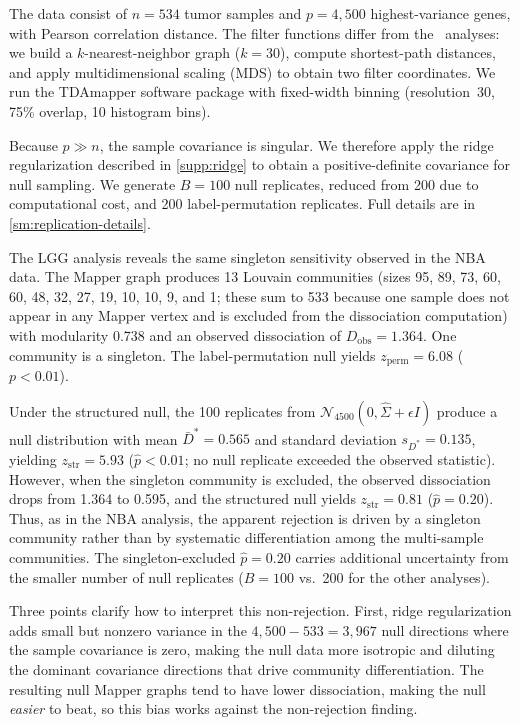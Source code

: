 \documentclass[hidelinks]{siamart251216}
\newcommand{\singletonExcludedLGGz}{0.81}
\begin{document}
The data consist of $n = 534$ tumor samples and $p = 4{,}500$
highest-variance genes, with Pearson correlation distance.  The filter
functions differ from the~\cite{Lum2013} analyses: we build a
$k$-nearest-neighbor graph ($k = 30$), compute shortest-path distances,
and apply multidimensional scaling (MDS) to obtain two filter
coordinates.  We run the TDAmapper software package with fixed-width
binning (resolution~30, 75\% overlap, 10 histogram bins).

Because $p \gg n$, the sample covariance is singular.  We therefore
apply the ridge regularization described in \cref{supp:ridge} to obtain
a positive-definite covariance for null sampling.  We generate $B = 100$
null replicates, reduced from 200 due to computational cost, and 200
label-permutation replicates.  Full details are in
\cref{sm:replication-details}.

The LGG analysis reveals the same singleton sensitivity observed in
the NBA data.  The Mapper graph produces 13 Louvain communities (sizes
95, 89, 73, 60, 60, 48, 32, 27, 19, 10, 10, 9, and 1; these sum to
533 because one sample does not appear in any Mapper vertex and is
excluded from the dissociation computation) with modularity 0.738
and an observed dissociation of $D_{\mathrm{obs}} = 1.364$.  One
community is a singleton.  The label-permutation null yields
$z_{\mathrm{perm}} = 6.08$ ($p < 0.01$).

Under the structured null, the 100 replicates from $\mathcal{N}_{4500}(0,
\hat{\Sigma} + \epsilon I)$ produce a null distribution with mean
$\bar{D}^* = 0.565$ and standard deviation $s_{D^*} = 0.135$, yielding
$z_{\mathrm{str}} = 5.93$ ($\hat{p} < 0.01$; no null replicate
exceeded the observed statistic).  However, when the singleton community
is excluded, the observed dissociation drops from 1.364 to 0.595, and
the structured null yields $z_{\mathrm{str}} = \singletonExcludedLGGz$
($\hat{p} = 0.20$).  Thus, as in the NBA analysis, the apparent
rejection is driven by a singleton community rather than by systematic
differentiation among the multi-sample communities.  The
singleton-excluded $\hat{p} = 0.20$ carries additional uncertainty from the
smaller number of null replicates ($B = 100$ vs.\ 200 for the other
analyses).

Three points clarify how to interpret this non-rejection.  First, ridge regularization adds small but nonzero variance in the
$4{,}500 - 533 = 3{,}967$ null directions where the sample covariance
is zero, making the null data more isotropic and diluting the dominant
covariance directions that drive community differentiation.  The
resulting null Mapper graphs tend to have lower dissociation, making
the null \emph{easier} to beat, so this bias works against the
non-rejection finding.
\end{document}
